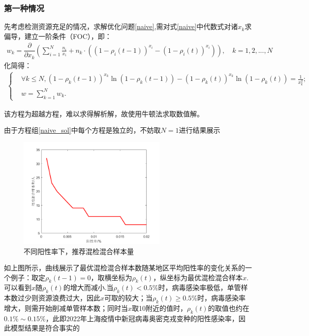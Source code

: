 \documentclass[withoutpreface,bwprint]{cumcmthesis} %
\begin{document}
\subsubsection{第一种情况}
先考虑检测资源充足的情况，求解优化问题\ref{naive},需对式\ref{naive}中代数式对诸$x_k$求偏导，建立一阶条件（FOC），即：
\begin{align*}
w_k = \dfrac{\partial}{\partial x_k} \left( \sum^N_{i=1} \frac{n_i}{x_i}+ n_k\cdot   ((1-\rho_i(t-1))^{x_i}-(1-\rho_i(t))^{x_i}) \right),\quad k=1,2,...,N
\end{align*}
化简得：
\begin{align}
\label{naive_sol}
\left\{
\begin{aligned}
        &\forall k \leqslant N,(1-\rho_k(t-1))^{x_k}\ln(1-\rho_k(t-1))-(1-\rho_k(t))^{x_k}\ln(1-\rho_k(t))=\frac{1}{x^2_k}; \\
    &w=\sum^N_{k=1}w_k.
\end{aligned}
\right.
\end{align}


该方程为超越方程，难以求得解析解，故使用牛顿法求取数值解。

由于方程组\ref{naive_sol}中每个方程是独立的，不妨取$N=1$进行结果展示
\begin{figure}[H]
\centering
\includegraphics[width=0.65\textwidth]{fig_pro1.png}
\caption{不同阳性率下，推荐混检混合样本量}
\label{pro1}
\end{figure}

如上图所示，曲线展示了最优混检混合样本数随某地区平均阳性率的变化关系的一个例子：取定$\rho_k(t-1)=0$，取横坐标为$\rho_k(t)$，纵坐标为最优混检混合样本$x$.可以看到$x$随$\rho_k(t)$的增大而减小.当$\rho_k(t)<0.5\%$时，病毒感染率极低，单管样本数过少则资源浪费过大，因此$x$可取的较大；当$\rho_k(t) \geqslant 0.5\%$时，病毒感染率增大，则需开始削减单管样本数；同时当$x$取10附近的值时，$\rho_k(t)$的取值也约在$0.1\% \sim 0.15\%$，此即2022年上海疫情中新冠病毒奥密克戎变种的阳性感染率，因此模型结果是符合事实的
\end{document}
